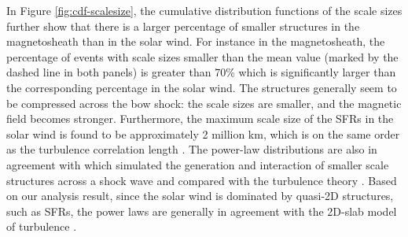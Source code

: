 In Figure \ref{fig:cdf-scalesize}, the cumulative distribution functions of the scale sizes further show that there is a larger percentage of smaller structures in the magnetosheath than in the solar wind. For instance in the magnetosheath, the percentage of events with scale sizes smaller than the mean value (marked by the dashed line in both panels) is greater than 70\% which is significantly larger than the corresponding percentage in the solar wind. The structures generally seem to be compressed across the bow shock: the scale sizes are smaller, and the magnetic field becomes stronger. Furthermore, the maximum scale size of the SFRs in the solar wind is found to be approximately 2 million km, which is on the same order as the turbulence correlation length \citep{Horbury:1996}. The power-law distributions are also in agreement with \citep{Nakanotani:2022, Nakanotani2:2022} which simulated the generation and interaction of smaller scale structures across a shock wave and compared with the turbulence theory \citep{Zank:2021, Zank:2017}. Based on our analysis result, since the solar wind is dominated by quasi-2D structures, such as SFRs, the power laws are generally in agreement with the 2D-slab model of turbulence \citep{Zank:2021, Zank:2017}.